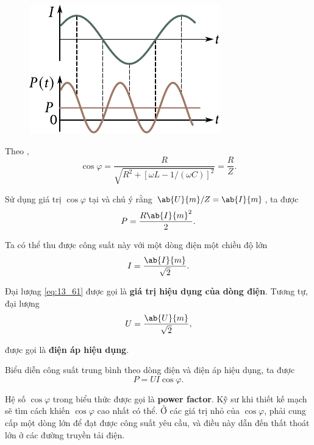 \begin{figure}[t]
	\begin{center}
		\includegraphics[scale=1]{figures/ch_13/fig_13_10.pdf}
		\caption[]{}
		\label{fig:13_10}
	\end{center}
	\vspace{-0.8cm}
\end{figure}

Theo ,
\begin{equation}\label{eq:13_59}
    \cos\varphi = \frac{R}{\sqrt{R^2+[\omega L - 1/(\omega C)]^2}} = \frac{R}{Z}.
\end{equation}

\noindent
Sử dụng giá trị  $\cos\varphi$ tại  và chú ý rằng $\ab{U}{m}/Z=\ab{I}{m}$, ta được
\begin{equation}\label{eq:13_60}
    P = \frac{R\ab{I}{m}^2}{2}.
\end{equation}

\noindent
Ta có thể thu được công suất này với một dòng điện một chiều độ lớn
\begin{equation}\label{eq:13_61}
    I = \frac{\ab{I}{m}}{\sqrt{2}}.
\end{equation}

\noindent
Đại lượng \eqref{eq:13_61} được gọi là \textbf{giá trị hiệu dụng của dòng điện}.
Tương tự, đại lượng
\begin{equation}\label{eq:13_62}
    U = \frac{\ab{U}{m}}{\sqrt{2}},
\end{equation}

\noindent
được gọi là \textbf{điện áp hiệu dụng}.

Biểu diễn công suất trung bình theo dòng điện và điện áp hiệu dụng, ta được
\begin{equation}\label{eq:13_63}
    P = U I \cos\varphi.
\end{equation}

\noindent
Hệ số $\cos\varphi$ trong biểu thức được gọi là \textbf{power factor}.
Kỹ sư khi thiết kế mạch sẽ tìm cách khiến $\cos\varphi$ cao nhất có thể.
Ở các giá trị nhỏ của $\cos\varphi$, phải cung cấp một dòng lớn để đạt được công suất yêu cầu, và điều này dẫn đến thất thoát lớn ở các đường truyền tải điện.